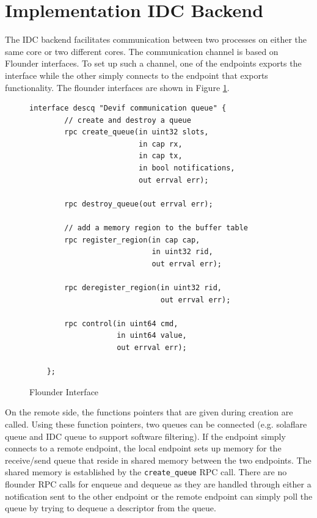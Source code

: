 \documentclass[a4paper,11pt,twoside]{report}
\begin{document}
\section{Implementation IDC Backend}
The IDC backend facilitates communication between two processes on either the same core
or two different cores. The communication channel is based on Flounder interfaces. To set 
up such a channel, one of the endpoints exports the interface while the other simply connects
to the endpoint that exports functionality. The flounder interfaces are shown in Figure \ref{lst:descq}.
\begin{figure}[h!]
	\caption{Flounder Interface}
	\begin{lstlisting}[style=code]
    interface descq "Devif communication queue" {
        // create and destroy a queue
        rpc create_queue(in uint32 slots, 
                         in cap rx, 
                         in cap tx,
	                     in bool notifications, 
                         out errval err);
                     
        rpc destroy_queue(out errval err);
	
        // add a memory region to the buffer table
        rpc register_region(in cap cap, 
                            in uint32 rid, 
                            out errval err);
                        
        rpc deregister_region(in uint32 rid, 
                              out errval err);
	
        rpc control(in uint64 cmd, 
                    in uint64 value, 
                    out errval err);
    
    };
	\end{lstlisting}
	\label{lst:descq}
\end{figure} 
On the remote side, the functions pointers that are given during creation are called. 
Using these function pointers, two queues can be connected (e.g. solaflare queue and 
IDC queue to support software filtering). If the endpoint simply 
connects to a remote endpoint, the local endpoint sets up memory for the receive/send 
queue that reside in shared memory between the two endpoints. 
The shared memory is established by the \texttt{create\_queue}
RPC call. There are no flounder RPC calls for enqueue and dequeue as they are handled through either 
a notification sent to the other endpoint or the remote endpoint can simply 
poll the queue by trying to dequeue a descriptor from the queue. 
\end{document}
